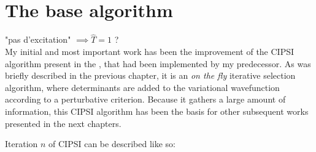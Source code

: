 \documentclass[./thesis.tex]{subfiles}
\begin{document}
\label{chap:CIPSI}


\section{The base algorithm}
\alert{"pas d'excitation" $\implies \hat T = 1$ ?}\\
My initial and most important work has been the improvement of the CIPSI algorithm present in the \QP, that had been implemented by my predecessor\cite{giner:tel-01077016}. As was briefly described in the previous chapter, it is an \emph{on the fly} iterative selection algorithm, where determinants are added to the variational wavefunction according to a perturbative criterion. Because it gathers a large amount of information, this CIPSI algorithm has been the basis for other subsequent works presented in the next chapters.

Iteration $n$ of CIPSI can be described like so:
\end{document}
